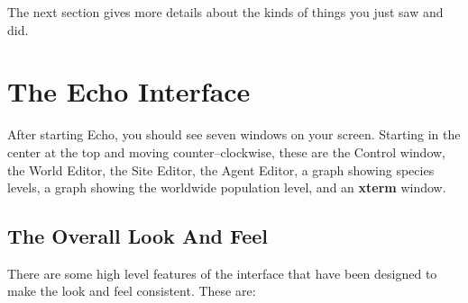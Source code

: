 The next section gives more details about the kinds of things you just
saw and did.


\section{The Echo Interface}

After starting Echo, you should see seven windows on your
screen. Starting in the center at the top and moving
counter--clockwise, these are the Control window, the World Editor,
the Site Editor, the Agent Editor, a graph showing species levels, a
graph showing the worldwide population level, and an {\bf xterm}
window.

\subsection{The Overall Look And Feel}

There are some high level features of the interface that have been
designed to make the look and feel consistent. These are:

